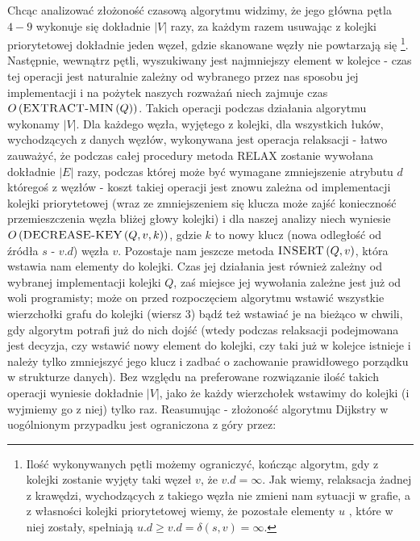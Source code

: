 Chcąc analizować złożoność czasową algorytmu widzimy, że jego główna pętla $4-9$ wykonuje się dokładnie $ \left| V \right| $ razy, za każdym razem usuwając z kolejki priorytetowej dokładnie jeden węzeł, gdzie skanowane węzły nie powtarzają się \footnote{Ilość wykonywanych pętli możemy ograniczyć, kończąc algorytm, gdy z kolejki zostanie wyjęty taki węzeł $v$, że $v.d = \infty$. Jak wiemy, relaksacja żadnej z krawędzi, wychodzących z takiego węzła nie zmieni nam sytuacji w grafie, a z własności kolejki priorytetowej wiemy, że pozostałe elementy $u$ , które w niej zostały, spełniają $u.d \geqslant v.d = \delta \left( s, v \right) = \infty$.}. Następnie, wewnątrz pętli, wyszukiwany jest najmniejszy element w kolejce - czas tej operacji jest naturalnie zależny od wybranego przez nas sposobu jej implementacji i na pożytek naszych rozważań niech zajmuje czas $O \left( \textrm{\textsc{EXTRACT-MIN}} \left( Q \right) \right)$. Takich operacji podczas działania algorytmu wykonamy $ \left| V \right| $. Dla każdego węzła, wyjętego z kolejki, dla wszystkich łuków, wychodzących z danych węzłów, wykonywana jest operacja relaksacji - łatwo zauważyć, że podczas całej procedury metoda \textsc{RELAX} zostanie wywołana dokładnie $ \left| E \right|$ razy, podczas której może być wymagane zmniejszenie atrybutu $d$ któregoś z węzłów - koszt takiej operacji jest znowu zależna od implementacji kolejki priorytetowej (wraz ze zmniejszeniem się klucza może zajść konieczność przemieszczenia węzła bliżej głowy kolejki) i dla naszej analizy niech wyniesie $O \left( \textrm{\textsc{DECREASE-KEY}} \left( Q, v, k \right) \right)$, gdzie $k$ to nowy klucz (nowa odległość od źródła $s$ - $v.d$) węzła $v$. Pozostaje nam jeszcze metoda $\textrm{\textsc{INSERT}} \left( Q, v \right)$, która wstawia nam elementy do kolejki. Czas jej działania jest również zależny od wybranej implementacji kolejki $Q$, zaś miejsce jej wywołania zależne jest już od woli programisty; może on przed rozpoczęciem algorytmu wstawić wszystkie wierzchołki grafu do kolejki (wiersz $3$) bądź też wstawiać je na bieżąco w chwili, gdy algorytm potrafi już do nich dojść (wtedy podczas relaksacji podejmowana jest decyzja, czy wstawić nowy element do kolejki, czy taki już w kolejce istnieje i należy tylko zmniejszyć jego klucz i zadbać o zachowanie prawidłowego porządku w strukturze danych). Bez względu na preferowane rozwiązanie ilość takich operacji wyniesie dokładnie $ \left| V\right|$, jako że każdy wierzchołek wstawimy do kolejki (i wyjmiemy go z niej) tylko raz. Reasumując - złożoność algorytmu Dijkstry w uogólnionym przypadku jest ograniczona z góry przez:

